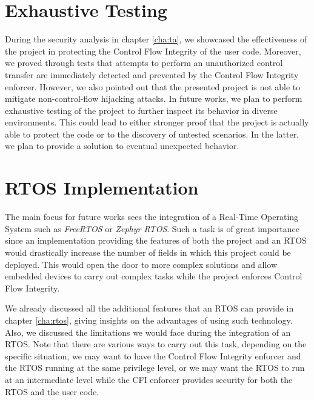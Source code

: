 \section{Exhaustive Testing}
\label{sec:future_testing}

During the security analysis in chapter \ref{cha:ta}, we showcased the
effectiveness of the project in protecting the Control Flow Integrity of the
user code. Moreover, we proved through tests that attempts to perform an
unauthorized control transfer are immediately detected and prevented by the
Control Flow Integrity enforcer. However, we also pointed out that the presented
project is not able to mitigate non-control-flow hijacking attacks. In future works,
we plan to perform exhaustive testing of the project to further inspect its
behavior in diverse environments. This could lead to either stronger proof that the
project is actually able to protect the code or to the discovery of untested scenarios.
In the latter, we plan to provide a solution to eventual unexpected behavior.

\section{RTOS Implementation}
\label{sec:future_rtos}

The main focus for future works sees the integration of a Real-Time Operating
System such as \textit{FreeRTOS} or \textit{Zephyr RTOS}. Such a task is of great
importance since an implementation providing the features of both the project and
an RTOS would drastically increase the number of fields in which this project could
be deployed. This would open the door to more complex solutions and allow
embedded devices to carry out complex tasks while the project enforces Control
Flow Integrity.

We already discussed all the additional features that an RTOS can provide in
chapter \ref{cha:rtos}, giving insights on the advantages of using such technology.
Also, we discussed the limitations we would face during the integration of an RTOS.
Note that there are various ways to carry out this task, depending on the specific
situation, we may want to have the Control Flow Integrity enforcer and the RTOS
running at the same privilege level, or we may want the RTOS to run at an intermediate
level while the CFI enforcer provides security for both the RTOS and the user code.

